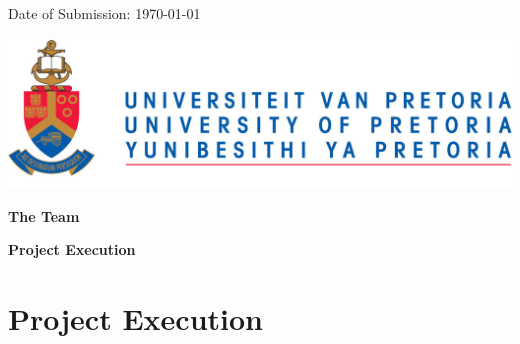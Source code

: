 \documentclass[11pt,a4paper,sans]{article}
\begin{document}
\begin{titlepage}
\vspace*{1cm}
{\large Date of Submission:} \today
\vfill
\begin{minipage}{\linewidth}
	\begin{center}
		\includegraphics[scale=0.3]{UP_Logo}
	\end{center}
\end{minipage}
\end{titlepage}
\restoregeometry

\pagebreak
\tableofcontents

\pagebreak
\thispagestyle{empty}
\pagecolor{titlepagecolor}
{\color{white}
\noindent
\textbf{\textsf{\huge The Team}}\\
\makebox[0pt][l]{\rule{1.3\textwidth}{1pt}}}
\restoregeometry
\nopagecolor


\pagebreak
\thispagestyle{empty}
\pagecolor{titlepagecolor}
{\color{white}
\noindent
\textbf{\textsf{\huge Project Execution}}\\
\makebox[0pt][l]{\rule{1.3\textwidth}{1pt}}}
\restoregeometry
\nopagecolor
\section{Project Execution}

\end{document}

